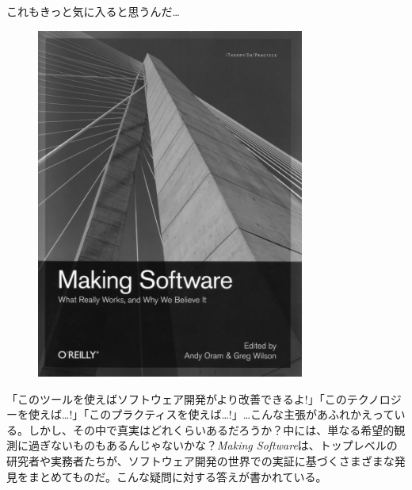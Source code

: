 
\thispagestyle{empty}

\sffamily

\Large これもきっと気に入ると思うんだ\ldots

\normalsize

\begin{figure}[h!]
\centering
\includegraphics[width=250pt]{../images/backmatter/making.pdf}
\end{figure}

「このツールを使えばソフトウェア開発がより改善できるよ!」「このテクノロジーを使えば…!」「このプラクティスを使えば…!」…こんな主張があふれかえっている。しかし、その中で真実はどれくらいあるだろうか？中には、単なる希望的観測に過ぎないものもあるんじゃないかな？\emph{Making Software}は、トップレベルの研究者や実務者たちが、ソフトウェア開発の世界での実証に基づくさまざまな発見をまとめてものだ。こんな疑問に対する答えが書かれている。

\vspace{-0.1cm}

